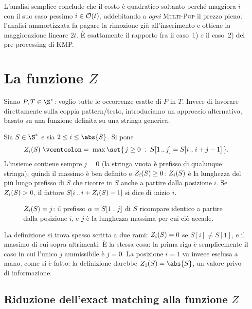 \noindent L'analisi semplice conclude che il costo è quadratico soltanto perché
maggiora $i$ con il suo caso pessimo $i\in\mathcal{O}(t)$, addebitando a \emph{ogni}
\textsc{Multi-Pop} il prezzo pieno; l'analisi ammortizzata fa pagare la rimozione
già all'inserimento e ottiene la maggiorazione lineare $2t$. È esattamente il
rapporto fra il caso~1) e il caso~2) del pre-processing di KMP.

\section{La funzione \texorpdfstring{$Z$}{Z}}
\label{sec:funzione-z}

Siano $P,T\in\alfa^{*}$: voglio tutte le occorrenze esatte di $P$ in $T$. Invece
di lavorare direttamente sulla coppia pattern/testo, introduciamo un approccio
alternativo, basato su una funzione definita su una stringa generica.

\begin{definizione}[Funzione $Z$]\label{def:funzione-z}
  Sia $S\in\alfa^{*}$ e sia $2\le i\le\abs{S}$. Si pone
  \[
    \Zv{i}(S)\;\defeq\;\max\set{\,j \ge 0 \;:\; \pre{S}{j}=\sub{S}{i}{i+j-1}\,} .
  \]
  L'insieme contiene sempre $j=0$ (la stringa vuota è prefisso di qualunque
  stringa), quindi il massimo è ben definito e $Z_{i}(S)\ge 0$: $Z_{i}(S)$ è la
  lunghezza del più lungo prefisso di $S$ che ricorre in $S$ anche a partire
  dalla posizione $i$. Se $Z_{i}(S)>0$, il fattore
  $S[i\,..\,i+Z_{i}(S)-1]$ si dice \Zbox di inizio $i$.
\end{definizione}

\begin{figure}[H]
  \centering
  
  \caption{$Z_{i}(S)=j$: il prefisso $\alpha=S[1\,..\,j]$ di $S$ ricompare
  identico a partire dalla posizione $i$, e $j$ è la lunghezza massima per cui
  ciò accade.}
  \label{fig:z-definizione}
\end{figure}

\begin{osservazione}
  La definizione si trova spesso scritta a due rami: $Z_{i}(S)=0$ se
  $S[i]\neq S[1]$, e il massimo di cui sopra altrimenti. È la stessa cosa: la
  prima riga è semplicemente il caso in cui l'unico $j$ ammissibile è $j=0$. La
  posizione $i=1$ va invece esclusa a mano, come si è fatto: la definizione
  darebbe $\Zv{1}(S)=\abs{S}$, un valore privo di informazione.
\end{osservazione}

\subsection{Riduzione dell'exact matching alla funzione
  \texorpdfstring{$Z$}{Z}}
\label{sec:z-riduzione}

